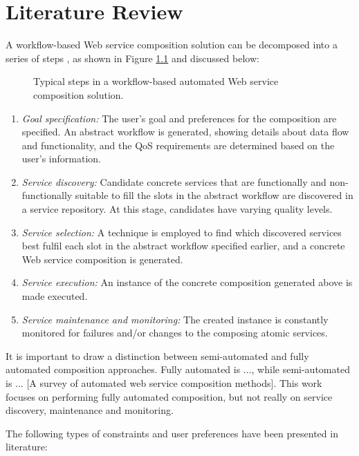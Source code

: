 \chapter{Literature Review}
A workflow-based Web service composition solution can be decomposed into a series of steps \cite{moghaddam2014service}, as shown in Figure \ref{fig:steps} and discussed below:

\begin{figure}
\caption{Typical steps in a workflow-based automated Web service composition solution.}
\label{fig:steps}
\end{figure}

\begin{enumerate}
 \item \textit{Goal specification:} The user's goal and preferences for the composition are specified. An abstract workflow is generated,
 showing details about data flow and functionality, and the QoS requirements are determined based on the user's information.
 \item \textit{Service discovery:} Candidate concrete services that are functionally and non-functionally suitable to fill the slots
 in the abstract workflow are discovered in a service repository. At this stage, candidates have varying quality levels.
 \item \textit{Service selection:} A technique is employed to find which discovered services best fulfil each slot in the abstract
 workflow specified earlier, and a concrete Web service composition is generated.
 \item \textit{Service execution:} An instance of the concrete composition generated above is made executed.
 \item \textit{Service maintenance and monitoring:} The created instance is constantly monitored for failures and/or changes
 to the composing atomic services.
\end{enumerate}

It is important to draw a distinction between semi-automated and fully automated composition approaches. Fully automated is ..., while semi-automated is ... [A survey of automated web service composition methods]. This work focuses on performing fully automated composition, but not really on service discovery, maintenance and monitoring.


The following types of constraints and user preferences have been presented in literature:

